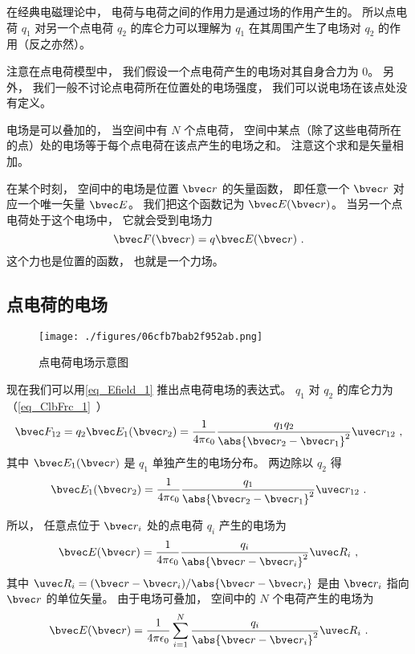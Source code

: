 

在经典电磁理论中， 电荷与电荷之间的作用力是通过场的作用产生的。 所以点电荷 $q_1$ 对另一个点电荷 $q_2$ 的库仑力可以理解为 $q_1$ 在其周围产生了电场对 $q_2$ 的作用（反之亦然）。

注意在点电荷模型中， 我们假设一个点电荷产生的电场对其自身合力为 0。 另外， 我们一般不讨论点电荷所在位置处的电场强度， 我们可以说电场在该点处没有定义。

电场是可以叠加的， 当空间中有 $N$ 个点电荷， 空间中某点（除了这些电荷所在的点）处的电场等于每个点电荷在该点产生的电场之和。 注意这个求和是矢量相加。

在某个时刻， 空间中的电场是位置 $\bvec r$ 的矢量函数， 即任意一个 $\bvec r$ 对应一个唯一矢量 $\bvec E$。 我们把这个函数记为 $\bvec E(\bvec r)$。 当另一个点电荷处于这个电场中， 它就会受到电场力
\begin{equation}\label{eq_Efield_1}
\bvec F(\bvec r) = q \bvec E(\bvec r)~.
\end{equation}
这个力也是位置的函数， 也就是一个力场。
 
\subsection{点电荷的电场}
\begin{figure}[ht]
\centering
\texttt{[image: ./figures/06cfb7bab2f952ab.png]}
\caption{点电荷电场示意图} \label{fig_Efield_4}
\end{figure}
现在我们可以用\autoref{eq_Efield_1} 推出点电荷电场的表达式。 $q_1$ 对 $q_2$ 的库仑力为（\autoref{eq_ClbFrc_1}~）
\begin{equation}\label{eq_Efield_3}
\bvec F_{12} = q_2 \bvec E_1(\bvec r_2) = \frac{1}{4\pi\epsilon_0}\frac{q_1 q_2}{\abs{\bvec r_2 - \bvec r_1}^2} \uvec r_{12}~,
\end{equation}
其中 $\bvec E_1(\bvec r)$ 是 $q_1$ 单独产生的电场分布。 两边除以 $q_2$ 得
\begin{equation}
\bvec E_1(\bvec r_2) = \frac{1}{4\pi\epsilon_0}\frac{q_1}{\abs{\bvec r_2 - \bvec r_1}^2} \uvec r_{12}~.
\end{equation}

所以， 任意点位于 $\bvec r_i$ 处的点电荷 $q_i$ 产生的电场为
\begin{equation}\label{eq_Efield_4}
\bvec E(\bvec r) = \frac{1}{4\pi\epsilon_0}\frac{q_i}{\abs{\bvec r - \bvec r_i}^2} \uvec R_i~,
\end{equation}
其中 $\uvec R_i = (\bvec r - \bvec r_i) / \abs{\bvec r - \bvec r_i}$ 是由 $\bvec r_i$ 指向 $\bvec r$ 的单位矢量。 由于电场可叠加， 空间中的 $N$ 个电荷产生的电场为
\begin{equation}\label{eq_Efield_2}
\bvec E(\bvec r) = \frac{1}{4\pi\epsilon_0} \sum_{i=1}^N \frac{q_i}{\abs{\bvec r - \bvec r_i}^2} \uvec R_i~.
\end{equation}

